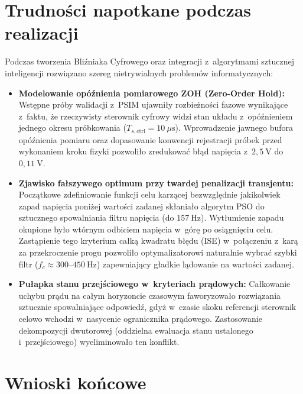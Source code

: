 \section{Trudności napotkane podczas realizacji}
\label{sec:trudnosci}

Podczas tworzenia Bliźniaka Cyfrowego oraz integracji z~algorytmami sztucznej inteligencji rozwiązano szereg nietrywialnych problemów informatycznych:
\begin{itemize}
    \item \textbf{Modelowanie opóźnienia pomiarowego ZOH (Zero-Order Hold):} Wstępne próby walidacji z~PSIM ujawniły rozbieżności fazowe wynikające z~faktu, że rzeczywisty sterownik cyfrowy widzi stan układu z~opóźnieniem jednego okresu próbkowania ($T_{s,\mathrm{ctrl}} = 10~\mu\mathrm{s}$). Wprowadzenie jawnego bufora opóźnienia pomiaru oraz dopasowanie konwencji rejestracji próbek przed wykonaniem kroku fizyki pozwoliło zredukować błąd napięcia z~$2{,}5~\mathrm{V}$ do $0{,}11~\mathrm{V}$.
    \item \textbf{Zjawisko fałszywego optimum przy twardej penalizacji transjentu:} Początkowe zdefiniowanie funkcji celu karzącej bezwzględnie jakikolwiek zapad napięcia poniżej wartości zadanej skłaniało algorytm PSO do sztucznego spowalniania filtru napięcia (do $157~\mathrm{Hz}$). Wytłumienie zapadu okupione było wtórnym odbiciem napięcia w~górę po osiągnięciu celu. Zastąpienie tego kryterium całką kwadratu błędu (ISE) w~połączeniu z~karą za przekroczenie progu pozwoliło optymalizatorowi naturalnie wybrać szybki filtr ($f_c \approx 300$--$450~\mathrm{Hz}$) zapewniający gładkie lądowanie na wartości zadanej.
    \item \textbf{Pułapka stanu przejściowego w~kryteriach prądowych:} Całkowanie uchybu prądu na całym horyzoncie czasowym faworyzowało rozwiązania sztucznie spowalniające odpowiedź, gdyż w~czasie skoku referencji sterownik celowo wchodzi w~nasycenie ogranicznika prądowego. Zastosowanie dekompozycji dwutorowej (oddzielna ewaluacja stanu ustalonego i~przejściowego) wyeliminowało ten konflikt.
\end{itemize}

\section{Wnioski końcowe}
\label{sec:wnioski}

